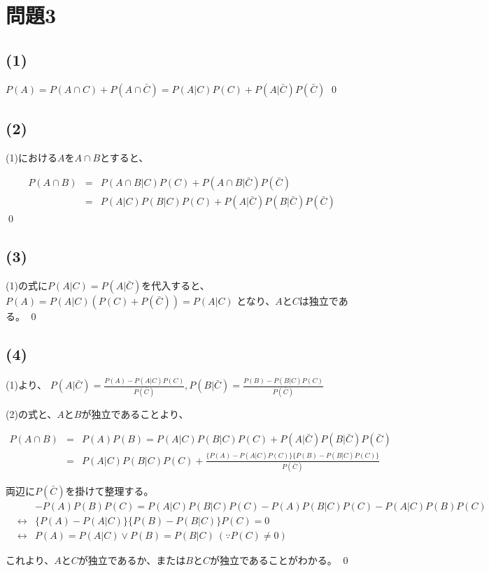 \documentclass[]{jsarticle}
\begin{document}
\section*{問題3}
    \subsection*{(1)}
        $P(A) = P(A\cap C) + P(A\cap \bar{C}) = P(A|C)P(C) +P(A|\bar{C})P(\bar{C})$
        \qed
    \subsection*{(2)}
        (1)における$A$を$A\cap B$とすると、

        \begin{eqnarray}
            P(A\cap B) &=& P(A\cap B|C)P(C) +P(A\cap B|\bar{C})P(\bar{C}) \nonumber \\
            &=& P(A|C)P(B|C)P(C) + P(A|\bar{C})P(B|\bar{C})P(\bar{C}) \nonumber
        \end{eqnarray}
        \qed
    \subsection*{(3)}
        (1)の式に$P(A|C) = P(A|\bar{C})$を代入すると、
        $P(A) = P(A|C)(P(C) +P(\bar{C})) = P(A|C)$
        となり、$A$と$C$は独立である。
        \qed
    \subsection*{(4)}
        (1)より、
        $\displaystyle P(A|\bar{C}) = \frac{P(A) -P(A|C)P(C)}{P(\bar{C})}, P(B|\bar{C}) = \frac{P(B) -P(B|C)P(C)}{P(\bar{C})}$

        (2)の式と、$A$と$B$が独立であることより、

        \begin{eqnarray}
            P(A\cap B) &=& P(A)P(B) = P(A|C)P(B|C)P(C) + P(A|\bar{C})P(B|\bar{C})P(\bar{C}) \nonumber \\
            &=& P(A|C)P(B|C)P(C) + \frac{\{P(A) -P(A|C)P(C)\}\{P(B) -P(B|C)P(C)\}}{P(\bar{C})} \nonumber
        \end{eqnarray}

        両辺に$P(\bar{C})$を掛けて整理する。
        \begin{eqnarray}
            &&- P(A)P(B)P(C) = P(A|C)P(B|C)P(C) - P(A)P(B|C)P(C) - P(A|C)P(B)P(C) \nonumber \\
            &\leftrightarrow& \{P(A) - P(A|C)\}\{P(B) - P(B|C)\}P(C) = 0 \nonumber \\
            &\leftrightarrow& P(A) = P(A|C) \vee P(B) = P(B|C) \ (\because P(C) \neq 0)\nonumber
        \end{eqnarray}

        これより、$A$と$C$が独立であるか、または$B$と$C$が独立であることがわかる。
        \qed
\end{document}
